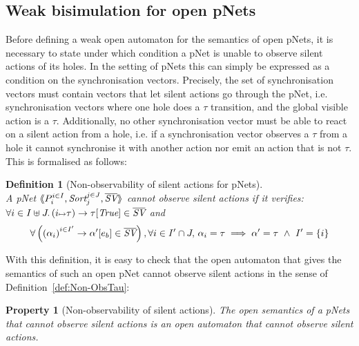 \documentclass{lmcs}
\newtheorem{definition}{Definition}
\newtheorem{property}{Property}
\begin{document}
\subsection{Weak bisimulation for open pNets}

Before defining a weak open automaton for the semantics of open pNets,
it is necessary to state under which condition a pNet is unable to
observe silent actions of its holes. In the setting of pNets this can
simply be expressed as a condition on the synchronisation
vectors. Precisely, the set of synchronisation vectors must contain
vectors that let silent actions go through the pNet,
i.e. synchronisation vectors where one hole does a $\tau$ transition,
and the global visible action is a $\tau$. Additionally, no other
synchronisation vector must be able to react on a silent action from a
hole, i.e. if a synchronisation vector observes a $\tau$ from a hole
it cannot synchronise it with another action nor emit an action that
is not $\tau$. This is formalised as follows:



\begin{definition}[Non-observability of silent actions for pNets]\label{def:non-obspNet}~\\
A pNet $\mylangle \pNet_i^{i\in I} , \Sort_j^{j\in J}, \set{\symb{SV}}\myrangle$
 \emph{cannot observe silent actions} if it verifies:\\ $\forall i\in I\uplus J.\, \SV{(i\mapsto \tau)}{\tau}{\True}\in \set{\symb{SV}}$ and 
\begin{equation*}
\forall \left(\SV{{(\alpha_i)}^{i\in I'}} 
{\alpha'} 
{e_b}\in \set{\symb{SV}}\right), %
\forall i\in I'\cap J,\, \alpha_i=\tau \implies %
\alpha'=\tau ~\land~ %
I'=\{i\}
\end{equation*}
\end{definition}

With this definition, it is easy to check that the open automaton that gives the semantics of such an open pNet cannot observe silent actions in the sense of Definition~\ref{def:Non-ObsTau}:

\begin{property}[Non-observability of silent actions]
The open semantics of a pNets that cannot observe silent actions is an open automaton that  cannot observe silent actions.
\end{property}
\end{document}
